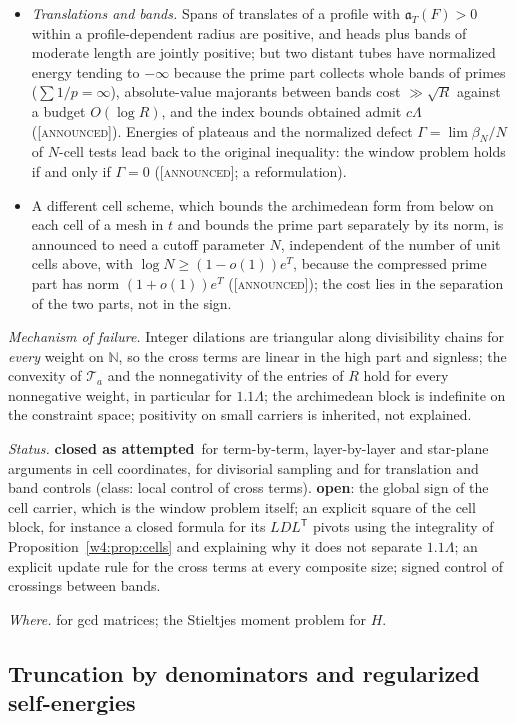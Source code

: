 \documentclass[11pt]{amsart}
\theoremstyle{definition}
\theoremstyle{remark}
\numberwithin{equation}{section}
\newcommand{\N}{\mathbb{N}}
\newcommand{\aT}{\mathfrak{a}_T}                       %
\newcommand{\stag}[1]{\textsc{[#1]}}
\newcommand{\ANNOUNCED}{\stag{announced}}
\newcommand{\rtag}[1]{\textbf{\small\textsf{#1}}}
\newcommand{\closedA}{\rtag{closed as attempted}}
\newcommand{\openR}{\rtag{open}}
\newcommand{\entry}[1]{\par\smallskip\noindent\textit{#1.}\enspace}
\begin{document}
\begin{itemize}
Section~\ref{w5:sec:dual}.
\item \emph{Translations and bands.} Spans of translates of a profile with $\aT(F)>0$ within a profile-dependent radius are positive, and
heads plus bands of moderate length are jointly positive; but two distant tubes have normalized energy tending to $-\infty$ because the prime
part collects whole bands of primes ($\sum1/p=\infty$), absolute-value majorants between bands cost $\gg\sqrt R$ against a budget $O(\log R)$,
and the index bounds obtained admit $c\Lambda$ (\ANNOUNCED). Energies of plateaus and the normalized defect $\Gamma=\lim\beta_N/N$ of $N$-cell
tests lead back to the original inequality: the window problem holds if and only if $\Gamma=0$ (\ANNOUNCED; a reformulation).
\item A different cell scheme, which bounds the archimedean form from below on each cell of a mesh in $t$ and bounds the prime part separately by its norm, is announced to need a cutoff parameter $N$, independent of the number of unit cells above, with $\log N\ge(1-o(1))e^T$, because the compressed prime part has norm $(1+o(1))e^T$ (\ANNOUNCED); the cost lies in the separation of the two parts, not in the sign.
\end{itemize}

\entry{Mechanism of failure} Integer dilations are triangular along divisibility chains for \emph{every} weight on $\N$, so the cross terms are
linear in the high part and signless; the convexity of $\mathcal T_a$ and the nonnegativity of the entries of $R$ hold for every nonnegative
weight, in particular for $1.1\Lambda$; the archimedean block is indefinite on the constraint space; positivity on small carriers is inherited,
not explained.

\entry{Status} \closedA\ for term-by-term, layer-by-layer and star-plane arguments in cell coordinates, for divisorial sampling and for
translation and band controls (class: local control of cross terms). \openR: the global sign of the cell carrier, which is the window problem
itself; an explicit square of the cell block, for instance a closed formula for its $LDL^{\mathsf T}$ pivots using the integrality of
Proposition~\ref{w4:prop:cells} and explaining why it does not separate $1.1\Lambda$; an explicit update rule for the cross terms at every
composite size; signed control of crossings between bands.

\entry{Where} \cite{Smith1876} for gcd matrices; the Stieltjes moment problem for $H$.

\subsection{Truncation by denominators and regularized self-energies}\label{w4:fam:R5}
\end{document}
